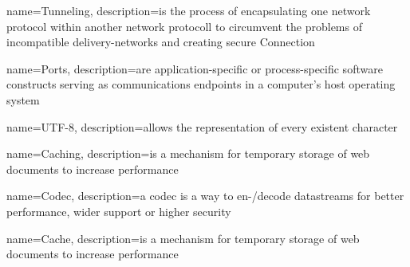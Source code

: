 {
  name=Tunneling,
  description={is the process of encapsulating one network protocol within another network protocoll to circumvent the problems of incompatible delivery-networks and creating secure Connection}
}

{
  name=Ports,
  description={are application-specific or process-specific software constructs serving as communications endpoints in a computer's host operating system}
}

{
  name=UTF-8,
  description={allows the representation of every existent character}
}

{
  name=Caching,
  description={is a mechanism for temporary storage of web documents to increase performance}
}

{
  name=Codec,
  description={a codec is a way to en-/decode datastreams for better performance, wider support or higher security}
}

{
  name=Cache,
  description={is a mechanism for temporary storage of web documents to increase performance}
}


